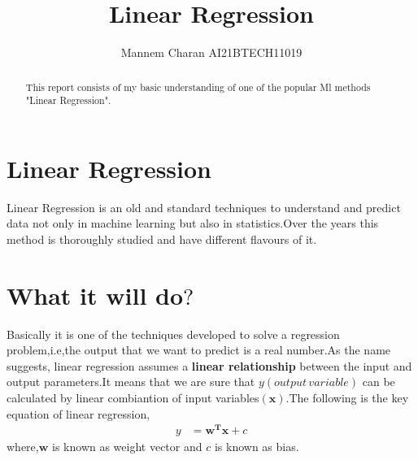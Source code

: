 \documentclass[journal,12pt,onecolumn]{IEEEtran}
\providecommand{\brak}[1]{\ensuremath{\left(#1\right)}}
\theoremstyle{remark}
\numberwithin{equation}{section}
\let\vec\mathbf
\begin{document}
   \title{ Linear Regression }
   \maketitle
   \author{ Mannem Charan AI21BTECH11019}
 \begin{abstract}
    This report consists of my basic understanding of one of the popular Ml methods "Linear Regression".
 \end{abstract}
  \section{Linear Regression}
   Linear Regression is an old and standard techniques to understand and predict data not only in machine learning but also in statistics.Over the years this method is thoroughly studied and have different flavours of it.
  \section{What it will do$?$}
  Basically it is one of the techniques developed to solve a regression problem,i.e,the output that we want to predict is a real number.As the name suggests, linear regression assumes a \textbf{linear relationship} between the input and output parameters.It means that we are sure that $y\brak{output \, variable}$ can be calculated by linear combiantion of input variables$\brak{\mathbf{x}}$.The following is the key equation of linear regression,
        \begin{align}
		y &= \vec{w^T}\vec{x} + c \label{eq:1}
	\end{align}
	where,$\vec{w}$ is known as weight vector and $c$ is known as bias.
\end{document}
